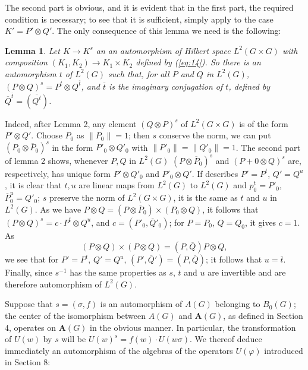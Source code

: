 \documentclass[12pt]{amsart}
\newtheorem{lemma}{Lemma}
\def\norm#1{{\left\|{#1}\right\|}}
\newcounter{ssection}
\renewcommand{\subsection}{
  \addtocounter{ssection}{1}{\bf  \arabic{ssection}.\  }}
\begin{document}
The second part is obvious, and it is evident that in the first part, 
the required condition is necessary;
to see that it is sufficient, simply apply to the case $K'= P'\otimes Q'$. 
The only consequence of this lemma we need is the following:
\begin{lemma}\label{l:3}
Let $K\to K^s$ an an automorphism of Hilbert space $L^2(G\times G)$
with composition $(K_1,K_2) \to K_1\times K_2$ defined by (\ref{eq:14}).
So there is an automorphism $t$ of  $L^2(G)$ such that, for all $P$ and $Q$ in
$L^2(G)$, $(P\otimes Q)^s = P^t \otimes Q^{\overline{t}}$, 
and $\overline{t}$ is the imaginary conjugation of  $t$, defined by 
$\overline{Q}^{\overline{t}}= (\overline{Q^t})$.
\end{lemma}
Indeed, after Lemma 2, any element $(Q\otimes P)^s$ of $L^2(G\times G)$
 is of the form $P'\otimes Q'$. Choose $P_0$ as $\norm{P_0}=1$; 
then $s$ conserve the norm, we can put 
$(P_0\otimes \overline{P}_0)^s$ in the form $P'_0\otimes Q'_0$ 
with $\norm{P'_0}=\norm{Q'_0}=1$. 	
The second part of lemma 2 shows, whenever $P,Q$ in $L^2(G)$
$(P\otimes \overline{P}_0)^s$ and $(P+0\otimes Q)^s$ are, respectively,
has unique form $P'\otimes Q'_0$ and $P'_0\otimes Q'$. 
If describes $P'= P^t$, $Q'= Q^u$, it is clear that $t, u$ are linear maps
from $L^2(G)$ to $L^2(G)$ and $p^t_0 = P'_0$, $\overline{P}^u_0=Q'_0$;
$s$ preserve the norm of $L^2(G\times G)$, 	
it is the same as $t$ and $u$ in $L^2(G)$.
As we have $P\otimes Q = (P\otimes \overline{P}_0)\times (P_0\otimes Q)$,
it follows that $(P\otimes Q)^s=c\cdot P^t\otimes Q^u$, 
and $c=(P'_0, \overline{Q}'_0)$; for $P=P_0$, $Q=Q_0$, it gives $c=1$.
As 
\[
(P\otimes Q)\times (P\otimes Q) = (P,\overline{Q})P\otimes Q,
\]
we see that for $P'= P^t$, $Q'=Q^u$, $(P',\overline{Q}')=(P,\overline{Q})$;
it follows that $u=\overline{t}$. 
Finally, since
$s^{-1}$ has the same properties as $s$, $t$ and $u$ are invertible and
 are therefore automorphism of $L^2(G)$.  

\subsection{}
Suppose that $s=(\sigma,f)$ is an automorphism of $A(G)$ belonging
to $B_{0}(G)$; the center of the isomorphism between $A(G)$ and
$\mathbf{A}(G)$, as defined in Section 4, operates on $\mathbf{A}(G)$
in the obvious manner. In particular, the transformation of $U(w)$
by $s$ will be $U(w)^{s}=f(w)\cdot U(w\sigma)$. We thereof deduce
immediately an automorphism of the algebras of the operators $U(\varphi)$
introduced in Section 8:
\end{document}
